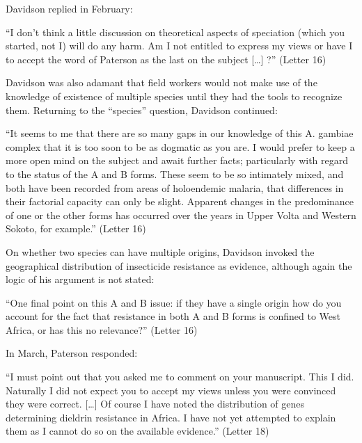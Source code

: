 \documentclass[a4paper,11pt,abstracton,hidelinks]{scrartcl}
\begin{document}
Davidson replied in February:


\begin{displayquote}
``I don't think a little discussion on theoretical aspects of speciation (which you started, not I) will do any harm. Am I not entitled to express my views or have I to accept the word of Paterson as the last on the subject [\ldots] ?'' (Letter 16)
\end{displayquote}


Davidson was also adamant that field workers would not make use of the knowledge of existence of multiple species until they had the tools to recognize them.
%
Returning to the ``species'' question, Davidson continued:


\begin{displayquote}
``It seems to me that there are so many gaps in our knowledge of this A. gambiae complex that it is too soon to be as dogmatic as you are. I would prefer to keep a more open mind on the subject and await further facts; particularly with regard to the status of the A and B forms. These seem to be so intimately mixed, and both have been recorded from areas of holoendemic malaria, that differences in their factorial capacity can only be slight. Apparent changes in the predominance of one or the other forms has occurred over the years in Upper Volta and Western Sokoto, for example.'' (Letter 16)
\end{displayquote}


On whether two species can have multiple origins, Davidson invoked the geographical distribution of insecticide resistance as evidence, although again the logic of his argument is not stated:


\begin{displayquote}
``One final point on this A and B issue: if they have a single origin how do you account for the fact that resistance in both A and B forms is confined to West Africa, or has this no relevance?'' (Letter 16)
\end{displayquote}


In March, Paterson responded:


\begin{displayquote}
``I must point out that you asked me to comment on your manuscript. This I did. Naturally I did not expect you to accept my views unless you were convinced they were correct. [\ldots] Of course I have noted the distribution of genes determining dieldrin resistance in Africa. I have not yet attempted to explain them as I cannot do so on the available evidence.'' (Letter 18)
\end{displayquote}
\end{document}

